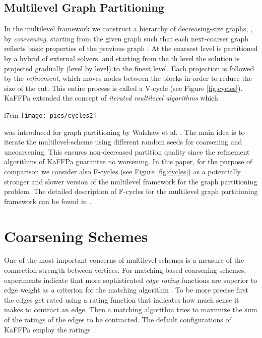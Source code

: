 \documentclass{llncs}
\begin{document}
\subsection{Multilevel Graph Partitioning}
In the multilevel framework we construct a hierarchy of decreasing-size graphs, ,  by \emph{coarsening}, starting from the given graph  such that each next-coarser graph  reflects basic properties of the previous graph . 
At the coarsest level  is partitioned by a hybrid of external solvers, and starting from the th level the solution is projected gradually (level by level) to the finest level. 
Each projection is followed by the \emph{refinement}, which moves nodes between the blocks in order to reduce the size of the cut.  
This entire process is called a V-cycle (see Figure \ref{fig:cycles}). KaFFPa \cite{kaffpa} extended the
concept of \emph{iterated multilevel algorithms}  which 
\begin{wrapfigure}{l}{7cm}
\centering
\vspace*{-.5cm}
\texttt{[image: pics/cycles2]}
\caption{V- and F-cycles schemes.}\label{fig:cycles}
\end{wrapfigure}
 was introduced for graph partitioning by Walshaw et al. \cite{walshaw2004multilevel}. 
The main idea is to iterate the multilevel-scheme using different random seeds for coarsening and uncoarsening. This ensures non-decreased partition quality since the refinement algorithms of KaFFPa guarantee no worsening.
In this paper, for the purpose of comparison we consider also F-cycles \cite{kaffpa} (see Figure \ref{fig:cycles})  as a potentially stronger and slower version of the multilevel framework for the graph partitioning problem. 
The detailed description of F-cycles for the multilevel graph partitioning framework can be found in \cite{kaffpa}.

\section{Coarsening Schemes}
\label{sec:coarsening}

\par One of the most important concerns of multilevel schemes is a measure of the connection strength between vertices. 
For matching-based coarsening schemes, experiments indicate that more sophisticated \textit{edge rating} functions are superior to edge weight as a criterion for the matching algorithm \cite{kappa}. 
To be more precise first the edges get rated using a rating function that indicates how much sense it makes to contract an edge. Then a matching algorithm tries to maximize the sum of the ratings of the edges to be contracted. 
The default configurations of KaFFPa employ the ratings 
\end{document}
